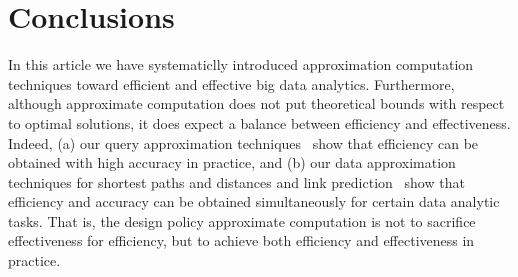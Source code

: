 \section{Conclusions}
\label{sec-conclusion}

In this article we have systematiclly introduced approximation computation techniques toward efficient and effective big data analytics.
Furthermore, although approximate computation does not put
theoretical bounds with respect to optimal solutions, it does expect a balance between efficiency and effectiveness. Indeed, (a) our query approximation techniques~\cite{tods-MaCFHW14,LinMZWH17,MaHWLH17} show that efficiency can be obtained with high accuracy in practice, and (b) our data approximation techniques for shortest paths and distances and link prediction~\cite{MaFLWCH16,DuanMAMH17} show that efficiency and accuracy can be obtained simultaneously for certain data analytic tasks. That is, the design policy approximate computation is not to sacrifice effectiveness for efficiency, but to achieve both efficiency and effectiveness in practice.

